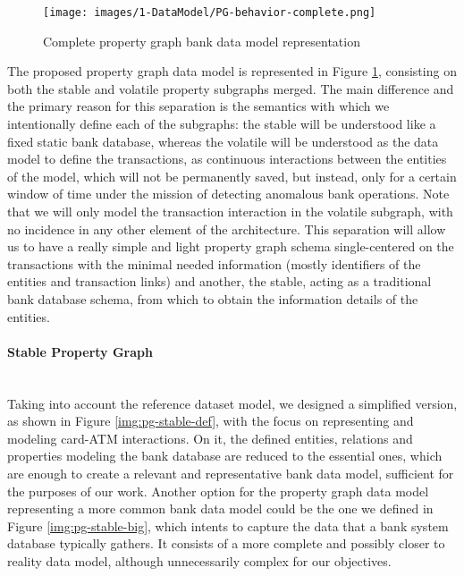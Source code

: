 \begin{figure}[h]
  \centering
  \texttt{[image: images/1-DataModel/PG-behavior-complete.png]}
  \caption{Complete property graph bank data model representation}
  \label{img:pg-complete}
\end{figure}

The proposed property graph data model is represented in Figure \ref{img:pg-complete}, consisting on both the stable and volatile property subgraphs merged.
The main difference and the primary reason for this separation is the semantics with which we intentionally define each of the subgraphs: the stable will be understood like a fixed static bank database, whereas the volatile will be understood as the data model to define the transactions, as continuous interactions between the entities of the model, which will not be permanently saved, but instead, only for a certain window of time under the mission of detecting anomalous bank operations. 
Note that we will only model the transaction interaction in the volatile subgraph, with no incidence in any other element of the architecture.
This separation will allow us to have a really simple and light property graph schema single-centered on the transactions with the minimal needed information 
(mostly identifiers of the entities and transaction links) and another, the stable, acting as a traditional bank database schema, from which to obtain the information details of the entities.

\paragraph*{Stable Property Graph\\\\}\label{section:stable-pg}

Taking into account the reference dataset model, we designed a simplified version, as shown in Figure \ref{img:pg-stable-def}, with the focus on representing and modeling card-ATM interactions. On it, the defined entities, relations and properties modeling the bank database are reduced to the essential ones, which are enough to create a relevant and representative bank data model, sufficient for the purposes of our work. Another option for the property graph data model representing a more common bank data model could be the one we defined in Figure \ref{img:pg-stable-big}, which intents to capture the data that a bank system database typically gathers. It consists of a more complete and possibly closer to reality data model, although unnecessarily complex for our objectives.\\

